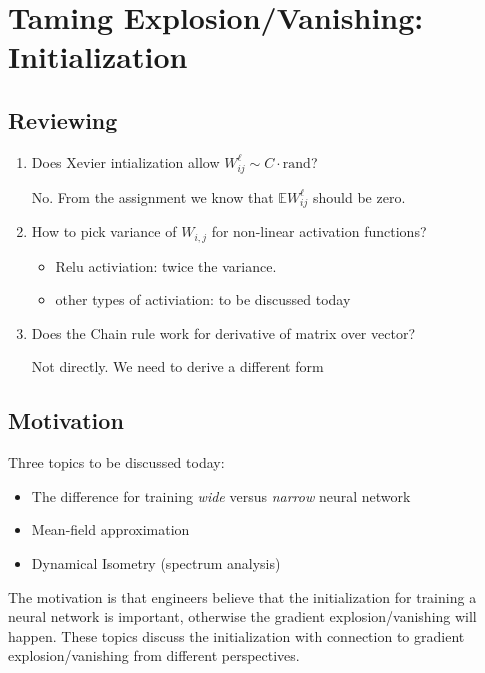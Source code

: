 \chapter{Taming Explosion/Vanishing: Initialization}

\section{Reviewing}
\begin{enumerate}
\item
Does Xevier intialization allow $W_{ij}^{\ell}\sim C\cdot\text{rand}$?

No. From the assignment we know that $\mathbb{E}W_{ij}^{\ell}$ should be zero.
\item
How to pick variance of $W_{i,j}$ for non-linear activation functions?
\begin{itemize}
\item
Relu activiation: twice the variance.
\item
other types of activiation: to be discussed today
\end{itemize}
\item
Does the Chain rule work for derivative of matrix over vector?

Not directly. We need to derive a different form

\end{enumerate}



\section{Motivation}
Three topics to be discussed today:
\begin{itemize}
\item
The difference for training \emph{wide} versus \emph{narrow} neural network
\item
Mean-field approximation
\item
Dynamical Isometry (spectrum analysis)
\end{itemize}

The motivation is that engineers believe that the initialization for training a neural network is important, otherwise the gradient explosion/vanishing will happen.
These topics discuss the initialization with connection to gradient explosion/vanishing from different perspectives.


